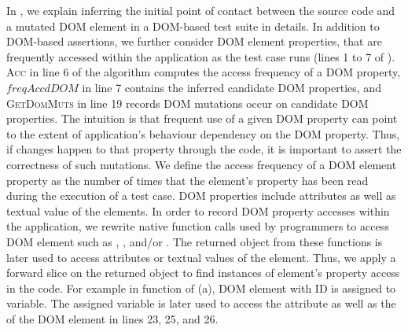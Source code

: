 In , we explain inferring the initial point of contact between the source code and a mutated DOM element in a DOM-based test suite in details.  
In addition to DOM-based assertions, we further consider DOM element properties, that are frequently accessed within the application as the test case runs (lines 1 to 7 of ). 
\textsc{Acc} in line 6 of the algorithm computes the access frequency of a DOM property, $freqAccdDOM$ in line 7 contains the inferred candidate DOM properties, and \textsc{GetDomMuts} in line 19 records DOM mutations occur
on candidate DOM properties.
The intuition is that frequent use of a given DOM property can point to the extent of application's behaviour dependency on the DOM property. Thus, if changes happen to that property through the \javascript code, it is important to assert the correctness of such mutations. We define the access frequency of a DOM element property as the number of times that the element's property has been read during the execution of a test case. DOM properties include attributes as well as textual value of the elements.
In order to record DOM property accesses within the application, we rewrite native function calls used by programmers to access DOM element such as , , and/or . The returned object from these functions is later used to access attributes or textual values of the element. Thus, we apply a forward slice on the returned object to find instances of element's property access in the code.
For example in function  of (a), DOM element with ID  is assigned to  variable. The assigned variable is later used to access the  attribute as well as the 
of the DOM element in lines 23, 25, and 26.

